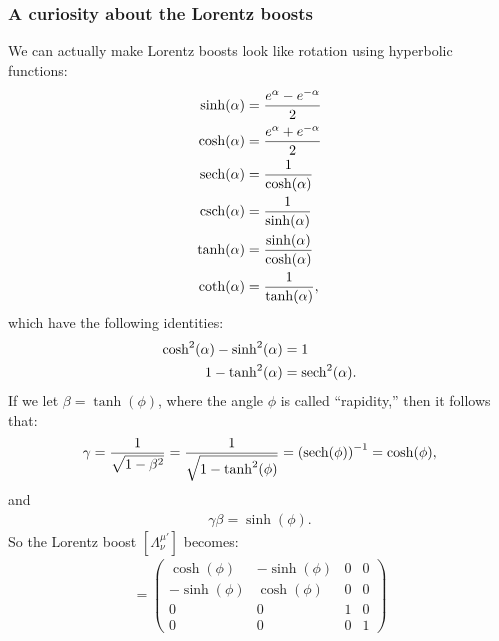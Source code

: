 \documentclass{article}
\theoremstyle{definition}
\begin{document}
\subsubsection{A curiosity about the Lorentz boosts}
We can actually make Lorentz boosts look like rotation using hyperbolic functions: 
\begin{align*}
\sinh(\alpha) &= \frac{e^{\alpha} - e^{-\alpha}}{2}\\
\cosh(\alpha) &= \frac{e^\alpha + e^{-\alpha}}{2}\\
\sech(\alpha) &= \frac{1}{\cosh(\alpha)}\\
\csch(\alpha) &= \frac{1}{\sinh(\alpha)}\\
\tanh(\alpha) &= \frac{\sinh(\alpha)}{\cosh(\alpha)}\\
\coth(\alpha) &= \frac{1}{\tanh(\alpha)},
\end{align*}
which have the following identities:
\begin{align*}
\cosh^2(\alpha) - \sinh^2(\alpha) &= 1\\
1 - \tanh^2(\alpha) &= \sech^2(\alpha).
\end{align*}
If we let $\beta = \tanh(\phi)$, where the angle $\phi$ is called ``rapidity,'' then it follows that:
\begin{align*}
\gamma = \frac{1}{\sqrt{1-\beta^2}} = \frac{1}{\sqrt{1-\tanh^2(\phi)}} = \left( \sech(\phi)  \right)^{-1} = \cosh(\phi), 
\end{align*}
and
\begin{align*}
\gamma\beta = \sinh(\phi).
\end{align*}
So the Lorentz boost $[\Lambda^{\mu'}_\nu]$ becomes:
\begin{align*}
[\Lambda^{\mu'}_\nu] =
\begin{pmatrix}
\cosh(\phi) & -\sinh(\phi) & 0 & 0\\
-\sinh(\phi) & \cosh(\phi) & 0 & 0\\
0 & 0 & 1 & 0\\
0 & 0 & 0 & 1
\end{pmatrix}
\end{align*}
\end{document}
